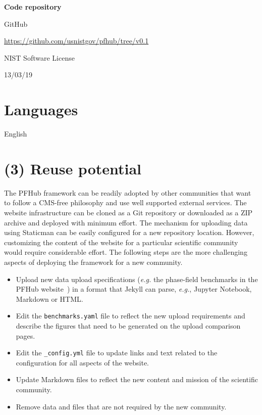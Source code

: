 \documentclass{jors}
\begin{document}
{\bf Code repository}

\begin{description}[noitemsep,topsep=0pt]
	\item[Name:] GitHub
	\item[Persistent identifier:] \url{https://github.com/usnistgov/pfhub/tree/v0.1}
	\item[Licence:] NIST Software License~\cite{nistlicense}
	\item[Date published:] 13/03/19
\end{description}

\section*{Languages}

English

\section*{(3) Reuse potential}

The PFHub framework can be readily adopted by other communities that
want to follow a CMS-free philosophy and use well supported external
services. The website infrastructure can be cloned as a Git repository
or downloaded as a ZIP archive and deployed with minimum effort. The
mechanism for uploading data using Staticman can be easily configured
for a new repository location. However, customizing the content of the
website for a particular scientific community would require
considerable effort. The following steps are the more challenging
aspects of deploying the framework for a new community.

\begin{itemize}
  \item Upload new data upload specifications (\emph{e.g.} the
    phase-field benchmarks in the PFHub website~\cite{pfhub}) in a
    format that Jekyll can parse, \emph{e.g.}, Jupyter Notebook,
    Markdown or HTML.
  \item Edit the \texttt{benchmarks.yaml} file to reflect the new
    upload requirements and describe the figures that need to be
    generated on the upload comparison pages.
  \item Edit the \texttt{\_config.yml} file to update links and text
    related to the configuration for all aspects of the website.
  \item Update Markdown files to reflect the new content and mission
    of the scientific community.
  \item Remove data and files that are not required by the new
    community.
\end{itemize}
\end{document}
